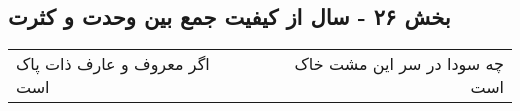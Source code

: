 \begin{center}
\section*{بخش ۲۶ - سال از کیفیت جمع بین وحدت و کثرت}
\label{sec:sh026}
\begin{longtable}{l p{0.5cm} r}
اگر معروف و عارف ذات پاک است
&&
چه سودا در سر این مشت خاک است
\\
\end{longtable}
\end{center}
